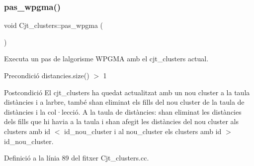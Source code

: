 \subsubsection{\texorpdfstring{pas\+\_\+wpgma()}{pas\_wpgma()}}
{\footnotesize\ttfamily void Cjt\+\_\+clusters\+::pas\+\_\+wpgma (\begin{DoxyParamCaption}{ }\end{DoxyParamCaption})}



Executa un pas de l\textquotesingle{}algorisme W\+P\+G\+MA amb el cjt\+\_\+clusters actual. 

\begin{DoxyPrecond}{Precondició}
distancies.\+size() $>$ 1 
\end{DoxyPrecond}
\begin{DoxyPostcond}{Postcondició}
El cjt\+\_\+clusters ha quedat actualitzat amb un nou cluster a la taula distàncies i a l\textquotesingle{}arbre, també s\textquotesingle{}han eliminat els fills del nou cluster de la taula de distàncies i la col·lecció. A la taula de distàncies\+: s\textquotesingle{}han eliminat les distàncies dels fills que hi havia a la taula i s\textquotesingle{}han afegit les distàncies del nou cluster als clusters amb id $<$ id\+\_\+nou\+\_\+cluster i al nou\+\_\+cluster els clusters amb id $>$ id\+\_\+nou\+\_\+cluster. 
\end{DoxyPostcond}


Definició a la línia 89 del fitxer Cjt\+\_\+clusters.\+cc.


